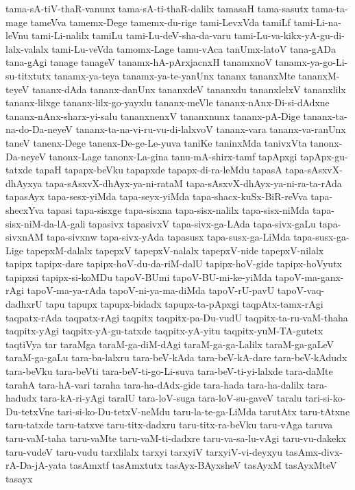 {tama-sA-tiV-thaR-vanunx
tama-sA-ti-thaR-dalilx
tamasaH
tama-sasutx
tama-ta-mage
tameVva
tamemx-Dege
tamemx-du-rige
tami-LevxVda
tamiLf
tami-Li-na-leVnu
tami-Li-nalilx
tamiLu
tami-Lu-deV-sha-da-varu
tami-Lu-va-kikx-yA-gu-di-lalx-valalx
tami-Lu-veVda
tamomx-Lage
tamu-vAca
tanUmx-latoV
tana-gADa
tana-gAgi
tanage
tanageV
tanamx-hA-pArxjacnxH
tanamxnoV
tanamx-ya-go-Li-su-titxtutx
tanamx-ya-teya
tanamx-ya-te-yanUnx
tananx
tananxMte
tananxM-teyeV
tananx-dAda
tananx-danUnx
tananxdeV
tananxdu
tananxlelxV
tananxlilx
tananx-lilxge
tananx-lilx-go-yayxlu
tananx-meVle
tananx-nAnx-Di-si-dAdxne
tananx-nAnx-sharx-yi-salu
tananxnenxV
tananxnunx
tananx-pA-Dige
tananx-ta-na-do-Da-neyeV
tananx-ta-na-vi-ru-vu-di-lalxvoV
tananx-vara
tananx-va-ranUnx
taneV
tanenx-Dege
tanenx-De-ge-Le-yuva
taniKe
taninxMda
tanivxVta
tanonx-Da-neyeV
tanonx-Lage
tanonx-La-gina
tanu-mA-shirx-tamf
tapApxgi
tapApx-gu-tatxde
tapaH
tapapx-beVku
tapapxde
tapapx-di-ra-leMdu
tapasA
tapa-sAsxvX-dhAyxya
tapa-sAsxvX-dhAyx-ya-ni-rataM
tapa-sAsxvX-dhAyx-ya-ni-ra-ta-rAda
tapasAyx
tapa-sesx-yiMda
tapa-seyx-yiMda
tapa-shacx-kuSx-BiR-reVva
tapa-shecxYva
tapasi
tapa-sisxge
tapa-sisxna
tapa-sisx-nalilx
tapa-sisx-niMda
tapa-sisx-niM-da-lA-gali
tapasivx
tapasivxV
tapa-sivx-ga-LAda
tapa-sivx-gaLu
tapa-sivxnAM
tapa-sivxnw
tapa-sivx-yAda
tapasusx
tapa-susx-ga-LiMda
tapa-susx-ga-Lige
tapepxM-dalalx
tapepxV
tapepxV-nalalx
tapepxV-nide
tapepxV-nilalx
tapipx
tapipx-dare
tapipx-hoV-du-da-riM-dalU
tapipx-hoV-gide
tapipx-hoVyutx
tapipxsi
tapipx-si-koMDu
tapoV-BUmi
tapoV-BU-mi-ke-yiMda
tapoV-ma-ganx-rAgi
tapoV-ma-ya-rAda
tapoV-ni-ya-ma-diMda
tapoV-rU-pavU
tapoV-vaq-dadhxrU
tapu
tapupx
tapupx-bidadx
tapupx-ta-pApxgi
taqpAtx-tamx-rAgi
taqpatx-rAda
taqpatx-rAgi
taqpitx
taqpitx-pa-Du-vudU
taqpitx-ta-ru-vaM-thaha
taqpitx-yAgi
taqpitx-yA-gu-tatxde
taqpitx-yA-yitu
taqpitx-yuM-TA-gutetx
taqtiVya
tar
taraMga
taraM-ga-diM-dAgi
taraM-ga-ga-Lalilx
taraM-ga-gaLeV
taraM-ga-gaLu
tara-ba-lalxru
tara-beV-kAda
tara-beV-kA-dare
tara-beV-kAdudx
tara-beVku
tara-beVti
tara-beV-ti-go-Li-suva
tara-beV-ti-yi-lalxde
tara-daMte
tarahA
tara-hA-vari
taraha
tara-ha-dAdx-gide
tara-hada
tara-ha-dalilx
tara-hadudx
tara-kA-ri-yAgi
taralU
tara-loV-suga
tara-loV-su-gaveV
taralu
tari-si-ko-Du-tetxVne
tari-si-ko-Du-tetxV-neMdu
taru-la-te-ga-LiMda
tarutAtx
taru-tAtxne
taru-tatxde
taru-tatxve
taru-titx-dadxru
taru-titx-ra-beVku
taru-vAga
taruva
taru-vaM-taha
taru-vaMte
taru-vaM-ti-dadxre
taru-va-sa-lu-vAgi
taru-vu-dakekx
taru-vudeV
taru-vudu
tarxlilalx
tarxyi
tarxyiV
tarxyiV-vi-deyxyu
tasAmx-divx-rA-Da-jA-yata
tasAmxtf
tasAmxtutx
tasAyx-BAyxsheV
tasAyxM
tasAyxMteV
tasayx
}
